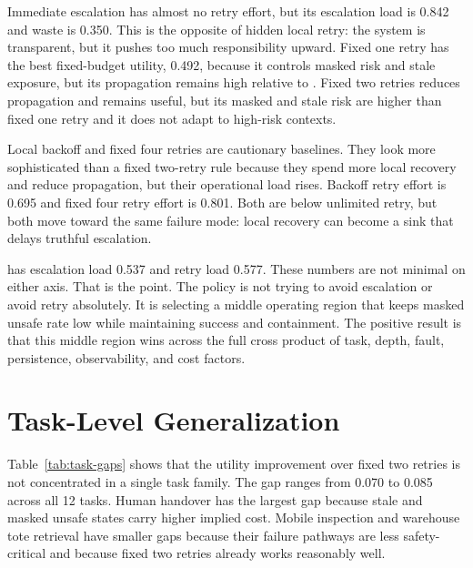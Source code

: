 \begin{table}[t]
\centering
\caption{Operational load by policy. Risk calibration spends more escalation than fixed two retries, less retry than high-retry policies, and much less waste than immediate escalation.}
\label{tab:policy-load}
\resizebox{\linewidth}{!}{}
\end{table}

Immediate escalation has almost no retry effort, but its escalation load is 0.842 and waste is 0.350. This is the opposite of hidden local retry: the system is transparent, but it pushes too much responsibility upward. Fixed one retry has the best fixed-budget utility, 0.492, because it controls masked risk and stale exposure, but its propagation remains high relative to \method. Fixed two retries reduces propagation and remains useful, but its masked and stale risk are higher than fixed one retry and it does not adapt to high-risk contexts.

Local backoff and fixed four retries are cautionary baselines. They look more sophisticated than a fixed two-retry rule because they spend more local recovery and reduce propagation, but their operational load rises. Backoff retry effort is 0.695 and fixed four retry effort is 0.801. Both are below unlimited retry, but both move toward the same failure mode: local recovery can become a sink that delays truthful escalation.

\method has escalation load 0.537 and retry load 0.577. These numbers are not minimal on either axis. That is the point. The policy is not trying to avoid escalation or avoid retry absolutely. It is selecting a middle operating region that keeps masked unsafe rate low while maintaining success and containment. The positive result is that this middle region wins across the full cross product of task, depth, fault, persistence, observability, and cost factors.

\section{Task-Level Generalization}

Table~\ref{tab:task-gaps} shows that the utility improvement over fixed two retries is not concentrated in a single task family. The gap ranges from 0.070 to 0.085 across all 12 tasks. Human handover has the largest gap because stale and masked unsafe states carry higher implied cost. Mobile inspection and warehouse tote retrieval have smaller gaps because their failure pathways are less safety-critical and because fixed two retries already works reasonably well.

